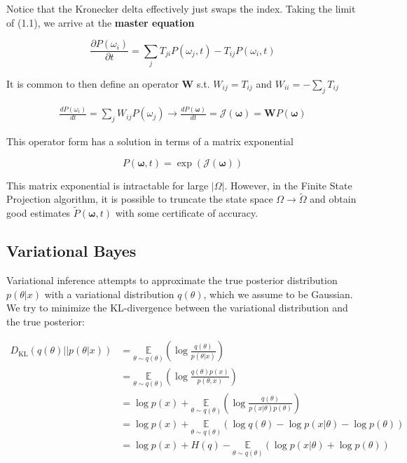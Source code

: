 \documentclass{ucetd}
\begin{document}
Notice that the Kronecker delta effectively just swaps the index. Taking the limit of (1.1), we arrive at the \textbf{master equation}


\begin{equation*}
\frac{\partial P(\omega_{i})}{\partial t} = \sum_{j}T_{ji}P(\omega_{j},t) - T_{ij}P(\omega_{i},t)
\end{equation*}

It is common to then define an operator $\bm{W}$ s.t. $W_{ij} = T_{ij}$ and $W_{ii} = -\sum_{j}T_{ij}$ 

\begin{align*}
\frac{dP(\omega_{i})}{dt} = \sum_{j}W_{ij}P(\omega_{j}) \rightarrow \frac{dP(\bm{\omega})}{dt} = \mathcal{J}(\bm{\omega}) = \mathbf{W}P(\bm{\omega})
\end{align*}

This operator form has a solution in terms of a matrix exponential

\begin{equation*}
P(\bm{\omega}, t) = \exp(\mathcal{J}(\bm{\omega}))
\end{equation*}

This matrix exponential is intractable for large $|\Omega|$. However, in the Finite State Projection algorithm, it is possible to truncate the state space $\Omega \rightarrow \tilde{\Omega}$ and obtain good estimates $\tilde{P}(\bm{\omega}, t)$ with some certificate of accuracy.

\subsection{Variational Bayes}

Variational inference attempts to approximate the true posterior distribution $p(\theta|x)$ with a variational distribution $q(\theta)$, which we assume to be Gaussian. We try to minimize the KL-divergence between the variational distribution and the true posterior:

\begin{align*}
D_{\mathrm{KL}}(q(\theta)||p(\theta|x)) &= \underset{{\theta \sim q(\theta)}}{\mathbb{E}}\left(\log\frac{q(\theta)}{p(\theta|x)}\right)\\
&=  \underset{{\theta \sim q(\theta)}}{\mathbb{E}}\left(\log\frac{q(\theta)p(x)}{p(\theta,x)}\right)\\
&=  \log p(x) + \underset{{\theta \sim q(\theta)}}{\mathbb{E}}\left(\log\frac{q(\theta)}{p(x|\theta)p(\theta)}\right)\\
&= \log p(x) + \underset{{\theta \sim q(\theta)}}{\mathbb{E}}\left(\log q(\theta) - \log p(x|\theta) - \log p(\theta) \right)\\
&= \log p(x) + H(q) -\underset{{\theta \sim q(\theta)}}{\mathbb{E}}\left(\log p(x|\theta) + \log p(\theta) \right)
\end{align*}
\end{document}
